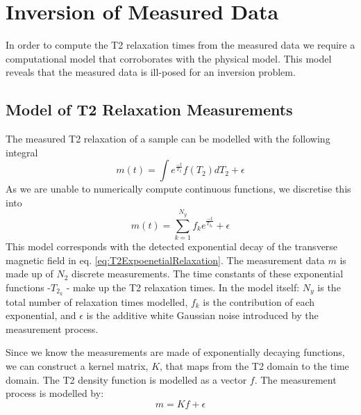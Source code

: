 \section{Inversion of Measured Data}
In order to compute the T2 relaxation times from the measured data we require a computational model that corroborates with the physical model. This model reveals that the measured data is ill-posed for an inversion problem.

\subsection{Model of T2 Relaxation Measurements}
The measured T2 relaxation of a sample can be modelled with the following integral
\begin{equation}
    m(t) = \int e^{\frac{-t}{T_2}} f(T_2) dT_2 + \epsilon
    \label{eq:T2RelaxationModelContinuous}
\end{equation}
As we are unable to numerically compute continuous functions, we discretise this into
\begin{equation}
    \hat{m}(t) = \sum^{N_y}_{k = 1} f_k e^{\frac{-t}{T_{2_k}}} + \epsilon
    \label{eq:T2RelaxationModel}
\end{equation}
This model corresponds with the detected exponential decay of the transverse magnetic field in eq. \ref{eq:T2ExpoenetialRelaxation}. The measurement data $m$ is made up of $N_2$ discrete measurements. The time constants of these exponential functions -$T_{2_k}$ - make up the T2 relaxation times. In the model itself: $N_y$ is the total number of relaxation times modelled, $f_k$ is the contribution of each exponential, and $\epsilon$ is the additive white Gaussian noise introduced by the measurement process.

Since we know the measurements are made of exponentially decaying functions, we can construct a kernel matrix, $K$, that maps from the T2 domain to the time domain. The T2 density function is modelled as a vector $f$. The measurement process is modelled by:
\begin{equation}
    m = Kf + \epsilon
    \label{eq:T2RelaxationModelMatrices}
\end{equation}


